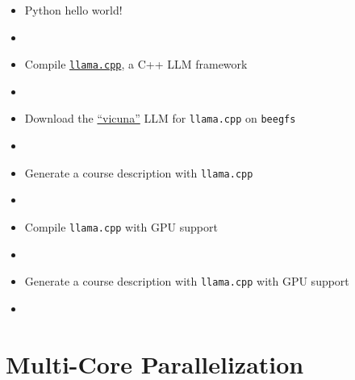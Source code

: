 \documentclass[12pt,aspectratio=169,xcolor=dvipsnames,hyperref={colorlinks,urlcolor=iiia_orange}]{beamer}
\begin{document}
\begin{frame}{}
    \begin{itemize}
        \setlength\itemsep{-1pt}
        \item[\faGithub] Python hello world!
        \item[] 
        \item[\faGithub] Compile \href{https://github.com/ggerganov/llama.cpp}{\texttt{llama.cpp}}, a C++ LLM framework
        \item[] 
        \item[\faGithub] Download the \href{https://lmsys.org/blog/2023-03-30-vicuna}{``vicuna''} LLM for \texttt{llama.cpp} on \texttt{beegfs}
        \item[] 
        \item[\faGithub] Generate a course description with \texttt{llama.cpp}
        \item[] 
        \item[\faGithub] Compile \texttt{llama.cpp} with GPU support
        \item[] 
        \item[\faGithub] Generate a course description with \texttt{llama.cpp} with GPU support
        \item[] 
    \end{itemize}
\end{frame}

\section{Multi-Core Parallelization}

\end{document}
